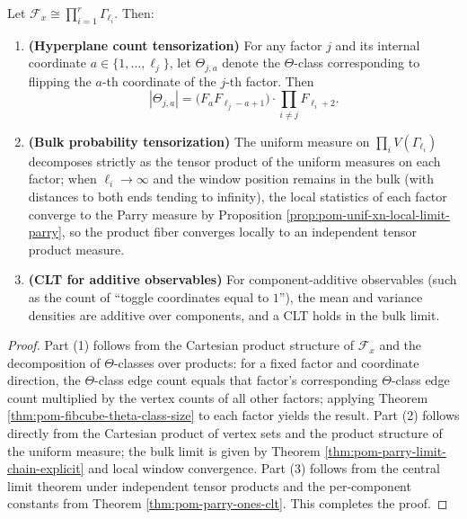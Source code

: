 \begin{proposition}\label{prop:pom-fiber-hyperplane-tensorization}
Let \(\mathcal F_x\cong\prod_{i=1}^r\Gamma_{\ell_i}\).
Then:
\begin{enumerate}
  \item \textbf{(Hyperplane count tensorization)}
  For any factor \(j\) and its internal coordinate \(a\in\{1,\dots,\ell_j\}\),
  let \(\Theta_{j,a}\) denote the \(\Theta\)-class corresponding to flipping the \(a\)-th coordinate of the \(j\)-th factor. Then
  \[
  |\Theta_{j,a}|
  =\bigl(F_aF_{\ell_j-a+1}\bigr)\cdot\prod_{i\neq j}F_{\ell_i+2}.
  \]
  \item \textbf{(Bulk probability tensorization)}
  The uniform measure on \(\prod_i V(\Gamma_{\ell_i})\) decomposes strictly as the tensor product of the uniform measures on each factor;
  when \(\ell_i\to\infty\) and the window position remains in the bulk (with distances to both ends tending to infinity),
  the local statistics of each factor converge to the Parry measure by Proposition \ref{prop:pom-unif-xn-local-limit-parry},
  so the product fiber converges locally to an independent tensor product measure.
  \item \textbf{(CLT for additive observables)}
  For component-additive observables (such as the count of ``toggle coordinates equal to \(1\)''), the mean and variance densities are additive over components, and a CLT holds in the bulk limit.
\end{enumerate}
\end{proposition}
\begin{proof}
Part (1) follows from the Cartesian product structure of \(\mathcal F_x\) and the decomposition of \(\Theta\)-classes over products:
for a fixed factor and coordinate direction, the \(\Theta\)-class edge count equals that factor's corresponding \(\Theta\)-class edge count multiplied by the vertex counts of all other factors;
applying Theorem \ref{thm:pom-fibcube-theta-class-size} to each factor yields the result.
Part (2) follows directly from the Cartesian product of vertex sets and the product structure of the uniform measure; the bulk limit is given by Theorem \ref{thm:pom-parry-limit-chain-explicit} and local window convergence.
Part (3) follows from the central limit theorem under independent tensor products and the per-component constants from Theorem \ref{thm:pom-parry-ones-clt}. This completes the proof.
\end{proof}

